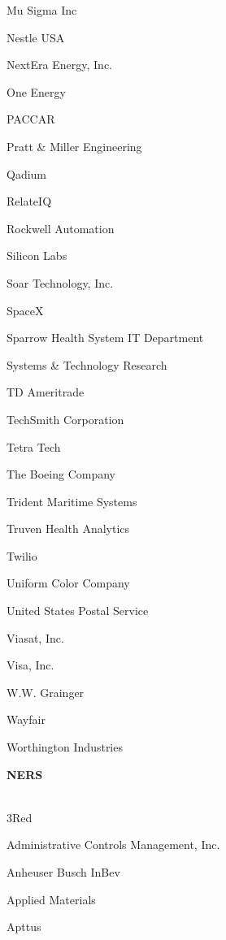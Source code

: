 \documentclass[twoside]{article}
\begin{document}
\begin{center}
\begin{multicols}{5}
\begin{FlushLeft}
\begin{compactitem}
\item Mu Sigma Inc
\item Nestle USA
\item NextEra Energy, Inc.
\item One Energy
\item PACCAR
\item Pratt \& Miller Engineering
\item Qadium
\item RelateIQ
\item Rockwell Automation
\item Silicon Labs
\item Soar Technology, Inc.
\item SpaceX
\item Sparrow Health System IT Department
\item Systems \& Technology Research
\item TD Ameritrade
\item TechSmith Corporation
\item Tetra Tech
\item The Boeing Company
\item Trident Maritime Systems
\item Truven Health Analytics
\item Twilio
\item Uniform Color Company
\item United States Postal Service
\item Viasat, Inc.
\item Visa, Inc.
\item W.W. Grainger
\item Wayfair
\item Worthington Industries
\end{compactitem}
        \end{FlushLeft}
        \vspace{1em}
        {\fontsize{14}{16}\selectfont \bf NERS}\\
        \vspace{-1em}
        ~\hrulefill~
        \vspace{-.9em}
        \begin{FlushLeft}
        \begin{compactitem}
        \item 3Red
\item Administrative Controls Management, Inc.
\item Anheuser Busch InBev
\item Applied Materials
\item Apttus

\end{compactitem}
\end{FlushLeft}
\end{multicols}
\end{center}
\end{document}
